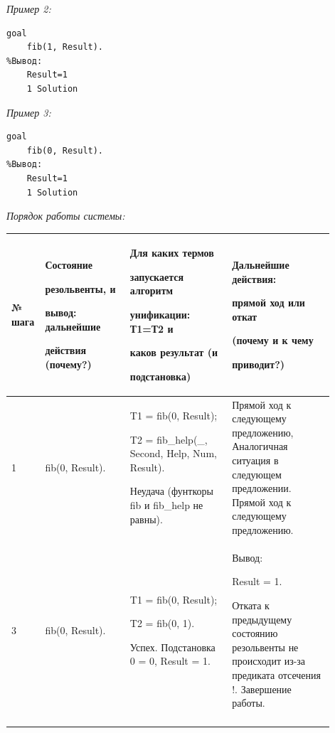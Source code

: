 \documentclass[a4paper,12pt]{article}
\begin{document}
	\textit{Пример 2:}
	
	\begin{verbatim}
goal
	fib(1, Result).
%Вывод:
	Result=1
	1 Solution
	\end{verbatim}
	
	\textit{Пример 3:}
	
	\begin{verbatim}
goal
	fib(0, Result).
%Вывод:
	Result=1
	1 Solution
	\end{verbatim}
	
	\textit{Порядок работы системы:}
	
	\begin{center}
		\begin{longtable}[h!]{|p{0.05\linewidth}|p{0.25\linewidth}|p{ 0.3\linewidth}|p{ 0.3\linewidth}|}
			\hline
			{№ шага} & {Состояние 
				
				резольвенты, и 
				
				вывод: дальнейшие 
				
				действия (почему?)} & {Для каких термов 
				
				запускается алгоритм 
				
				унификации: Т1=Т2 и 
				
				каков {\bf результат} (и 
				
				подстановка)} & {Дальнейшие действия: 
				
				прямой ход или откат 
				
				(почему и к чему 
				
				приводит?)}\\
			\hline
			{1} & {fib(0, Result).} & {T1 = fib(0, Result);
			
		T2 = fib\_help(\_, Second, Help, Num, Result).
	
Неудача (фунткоры fib и fib\_help не равны).} & {Прямой ход к следующему предложению, Аналогичная ситуация в следующем предложении. Прямой ход к следующему предложению.}\\
			\hline
			{3} & {fib(0, Result).} & {T1 = fib(0, Result);
			
		T2 = fib(0, 1).
	
Успех. Подстановка 0 = 0, Result = 1.} & {Вывод:

Result = 1.

Отката к предыдущему состоянию резольвенты не происходит из-за предиката отсечения !. Завершение работы.}\\
			\label{m3}
		\end{longtable}
	\end{center}
	
\end{document}

